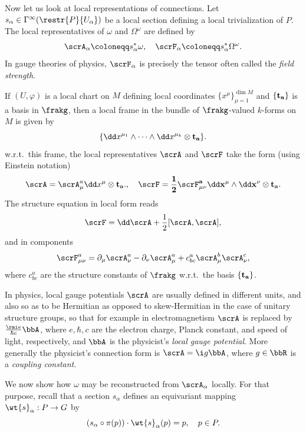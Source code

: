 Now let us look at local representations of connections. Let $s_\alpha\in\Gamma^\infty(\restr{P}{U_\alpha})$ be a local section defining  a local trivialization of $P$. The local representatives of $\omega$ and $\Omega^\omega$ are defined by
\[\scrA_\alpha\coloneqq s_\alpha^\ast\omega,\quad \scrF_\alpha\coloneqq s_\alpha^\ast \Omega^\omega.\]
In gauge theories of physics, $\scrF_\alpha$ is precisely the tensor often called the \emph{field strength}. 

\begin{rem}\label{rem 1.3.10 RS2}
    If $(U,\varphi)$ is a local chart on $M$ defining local coordinates $\{x^\mu\}_{\mu=1}^{\dim M}$ and $\{\bf{t}_a\}$ is a basis in $\frakg$, then a local frame in the bundle of $\frakg$-valued $k$-forms on $M$ is given by
    \[\{\dd x^{\mu_1}\wedge\cdots\wedge \dd x^{\mu_k}\otimes\bf{t}_a\}.\]
    w.r.t.\ this frame, the local representatives $\scrA$ and $\scrF$ take the form (using Einstein notation)
    \[\scrA=\scrA_\mu^a \dd x^\mu \otimes\bf{t}_a.,\quad \scrF=\frac12 \scrF_{\mu\nu}^a \dd x^\mu\wedge\dd x^\nu\otimes \bf{t}_a.\]
    The structure equation in local form reads
    \[\scrF=\dd\scrA+ \frac12[\scrA,\scrA],\]
    and in components
    \[\scrF_{\mu\nu}^a=\partial_\mu \scrA_\nu^a-\partial_\nu \scrA_\mu^a+c^a_{bc}\scrA^b_\mu \scrA_\nu^c,\]
    where $c^a_{bc}$ are the structure constants of $\frakg$ w.r.t.\ the basis $\{\bf{t}_a\}$.

    In physics, local gauge potentials $\scrA$ are usually defined in different units, and also so as to be Hermitian as opposed to skew-Hermitian in the case of unitary structure groups, so that for example in electromagnetism $\scrA$ is replaced by $\frac{\rmi e}{\hbar c}\bbA$, where $e,\hbar,c$ are the electron charge, Planck constant, and speed of light, respectively, and $\bbA$ is the physicist's \emph{local gauge potential}. More generally the physicist's connection form is $\scrA=\i g \bbA$, where $g\in\bbR$ is a \emph{coupling constant}.
\end{rem}


We now show how $\omega$ may be reconstructed from $\scrA_\alpha$ locally. For that purpose, recall that a section $s_\alpha$ defines an equivariant mapping $\wt{s}_\alpha:P\to G$ by
\[(s_\alpha\circ\pi(p))\cdot \wt{s}_\alpha(p)=p,\quad p\in P.\label{eq 1.3.13 RS2}\]

